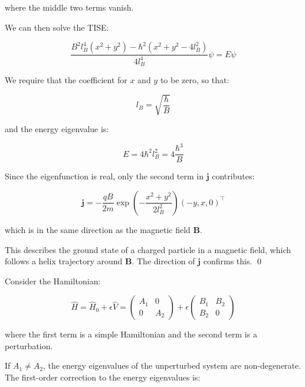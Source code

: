 \documentclass[12pt]{article}
\begin{document}
where the middle two terms vanish.

We can then solve the TISE:

\begin{equation}
    \frac{B^{2}l_{B}^{4}(x^{2} + y^{2}) - \hbar^{2}(x^{2} + y^{2} - 4l_{B}^{2})}{4l_{B}^{4}} \psi = E\psi
\end{equation}

We require that the coefficient for $x$ and $y$ to be zero, so that:

\begin{equation}
    l_{B} = \sqrt{\frac{\hbar}{B}}
\end{equation}

and the energy eigenvalue is:

\begin{equation}
    E = 4\hbar^{2}l_{B}^{2} = 4 \frac{\hbar^{3}}{B}
\end{equation}

Since the eigenfunction is real, only the second term in $\mathbf{j}$ contributes:

\begin{equation}
    \mathbf{j} = -\frac{qB}{2m} \exp \left( -\frac{x^{2} + y^{2}}{2l_{B}^{2}} \right) (-y, x, 0)^{\intercal}
\end{equation}

which is in the same direction as the magnetic field $\mathbf{B}$.

This describes the ground state of a charged particle in a magnetic field, which follows a helix trajectory around $\mathbf{B}$. The direction of $\mathbf{j}$ confirms this.
\qed



Consider the Hamiltonian:

\begin{equation}
    \hat{H} = \hat{H}_{0} + \epsilon \hat{V}
    =
    \begin{pmatrix}
        A_{1} & 0     \\
        0     & A_{2}
    \end{pmatrix}
    +
    \epsilon
    \begin{pmatrix}
        B_{1} & B_{2} \\
        B_{2} & 0
    \end{pmatrix}
\end{equation}

where the first term is a simple Hamiltonian and the second term is a perturbation.

If $A_{1} \ne A_{2}$, the energy eigenvalues of the unperturbed system are non-degenerate. The first-order correction to the energy eigenvalues is:
\end{document}
